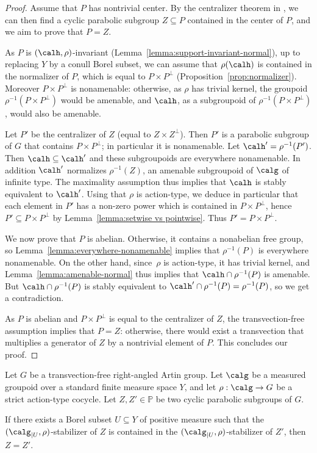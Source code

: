 \begin{proof}
Assume that $P$ has nontrivial center. By the centralizer theorem in \cite{Ser}, we can then find a cyclic parabolic subgroup $Z\subseteq P$ contained in the center of $P$, and we aim to prove that $P=Z$.

As $P$ is $(\calh,\rho)$-invariant (Lemma~\ref{lemma:support-invariant-normal}), up to replacing $Y$ by a conull Borel subset, we can assume that $\rho(\calh)$ is contained in the normalizer of $P$, which is equal to $P\times P^{\perp}$ (Proposition~\ref{prop:normalizer}). Moreover $P\times P^{\perp}$ is nonamenable: otherwise, as $\rho$ has trivial kernel, the groupoid $\rho^{-1}(P\times P^{\perp})$ would be amenable, and $\calh$, as a subgroupoid of $\rho^{-1}(P\times P^{\perp})$, would also be amenable.

Let $P'$ be the centralizer of $Z$ (equal to $Z\times Z^{\perp}$). Then $P'$ is a parabolic subgroup of $G$ that contains $P\times P^\perp$; in particular it is nonamenable. Let $\calh'=\rho^{-1}(P')$. Then $\calh\subseteq\calh'$ and these subgroupoids are everywhere nonamenable. In addition $\calh'$ normalizes $\rho^{-1}(Z)$, an amenable subgroupoid of $\calg$ of infinite type. The maximality assumption thus implies that $\calh$ is stably equivalent to $\calh'$. Using that $\rho$ is action-type, we deduce in particular that each element in $P'$ has a non-zero power which is contained in $P\times P^\perp$, hence $P'\subseteq P\times P^{\perp}$ by Lemma~\ref{lemma:setwise vs pointwise}. Thus $P'=P\times P^\perp$.

We now prove that $P$ is abelian. Otherwise, it contains a nonabelian free group, so Lemma~\ref{lemma:everywhere-nonamenable} implies that $\rho^{-1}(P)$ is everywhere nonamenable. On the other hand, since~$\rho$ is action-type, it has trivial kernel, and Lemma~\ref{lemma:amenable-normal} thus implies that $\calh\cap\nobreak \rho^{-1}(P)$ is amenable. But $\calh\cap\rho^{-1}(P)$ is stably equivalent to $\calh'\cap\rho^{-1}(P)=\rho^{-1}(P)$, so we get a contradiction.

As $P$ is abelian and $P\times P^{\perp}$ is equal to the centralizer of $Z$, the transvection-free assumption implies that $P=Z$: otherwise, there would exist a transvection that multiplies a generator of $Z$ by a nontrivial element of $P$. This concludes our proof.
\end{proof}


\begin{lemma}\label{lemma:uniqueness}
Let $G$ be a transvection-free right-angled Artin group. Let $\calg$ be a measured groupoid over a standard finite measure space $Y$, and let $\rho:\calg\to G$ be a strict action-type cocycle. Let $Z,Z'\in\mathbb{P}$ be two cyclic parabolic subgroups of $G$.

If there exists a Borel subset $U\subseteq Y$ of positive measure such that the $(\calg_{|U},\rho)$-stabilizer of $Z$ is contained in the $(\calg_{|U},\rho)$-stabilizer of $Z'$, then $Z=Z'$.
\end{lemma}

